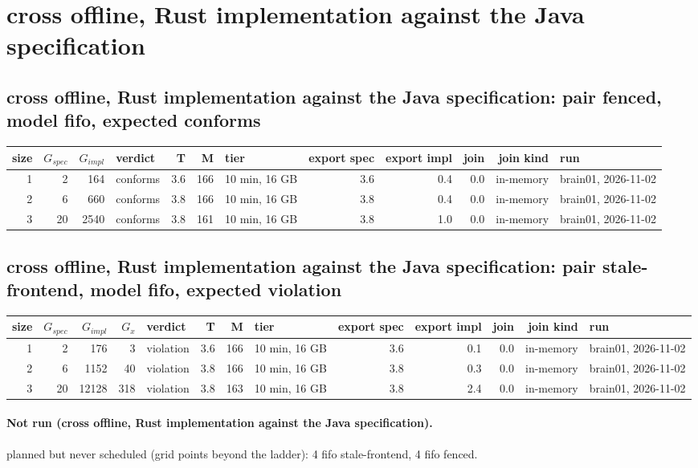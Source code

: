 \documentclass[10pt]{article}
\begin{document}
\section*{cross offline, Rust implementation against the Java specification}
\subsection*{cross offline, Rust implementation against the Java specification: pair \textsf{fenced}, model fifo, expected conforms}
\begin{longtable}{@{}rrrlrrlrrrrl@{}}
\toprule
size & $G_{\mathit{spec}}$ & $G_{\mathit{impl}}$ & verdict & T & M & tier & export spec & export impl & join & join kind & run \\
\midrule
\endhead
\color{red} 1 & 2 & 164 & conforms & 3.6 & 166 & 10 min, 16 GB & 3.6 & 0.4 & 0.0 & in-memory & brain01, 2026-11-02 \\
\color{red} 2 & 6 & 660 & conforms & 3.8 & 166 & 10 min, 16 GB & 3.8 & 0.4 & 0.0 & in-memory & brain01, 2026-11-02 \\
\color{red} 3 & 20 & 2540 & conforms & 3.8 & 161 & 10 min, 16 GB & 3.8 & 1.0 & 0.0 & in-memory & brain01, 2026-11-02 \\
\bottomrule
\end{longtable}
\subsection*{cross offline, Rust implementation against the Java specification: pair \textsf{stale-frontend}, model fifo, expected violation}
\begin{longtable}{@{}rrrrlrrlrrrrl@{}}
\toprule
size & $G_{\mathit{spec}}$ & $G_{\mathit{impl}}$ & $G_x$ & verdict & T & M & tier & export spec & export impl & join & join kind & run \\
\midrule
\endhead
\color{red} 1 & 2 & 176 & 3 & violation & 3.6 & 166 & 10 min, 16 GB & 3.6 & 0.1 & 0.0 & in-memory & brain01, 2026-11-02 \\
\color{red} 2 & 6 & 1152 & 40 & violation & 3.8 & 166 & 10 min, 16 GB & 3.8 & 0.3 & 0.0 & in-memory & brain01, 2026-11-02 \\
\color{red} 3 & 20 & 12128 & 318 & violation & 3.8 & 163 & 10 min, 16 GB & 3.8 & 2.4 & 0.0 & in-memory & brain01, 2026-11-02 \\
\bottomrule
\end{longtable}
\paragraph{Not run (cross offline, Rust implementation against the Java specification).}
planned but never scheduled (grid points beyond the ladder): 4 fifo stale-frontend, 4 fifo fenced.\par
\end{document}
